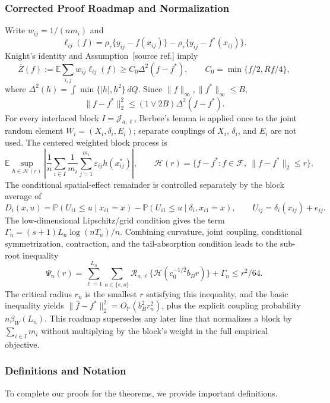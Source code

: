 \documentclass[twoside,11pt]{article}
\makeatletter
\newenvironment{revision}{\color{revisionred}}{}
\newcommand{\discardlabel}[1]{}
\newcommand{\discardtwo}[2]{}
\newcommand{\legacyref}[1]{\textup{[source ref.]}}
\newcommand{\legacyeqref}[1]{\textup{[source equation]}}
\newenvironment{legacycomparison}{%
  \begingroup\color{legacygray}%
  \let\label\discardlabel
  \let\originallabel\discardlabel
  \let\ref\legacyref
  \let\pageref\legacyref
  \let\eqref\legacyeqref
  \let\cref\legacyref
  \let\Cref\legacyref
  \let\autoref\legacyref
  \let\aliasref\discardtwo
}{\endgroup}
\newcommand{\aliasref}[2]{%
  \@ifundefined{r@#2}{}{%
    \expandafter\let\csname r@#1\expandafter\endcsname\csname r@#2\endcsname}}
\makeatother
\begin{document}
\begin{legacycomparison}
\subsubsection{Corrected Proof Roadmap and Normalization}
\begin{revision}
Write $w_{ij}=1/(nm_i)$ and
\[
 \ell_{ij}(f)=\rho_\tau\{y_{ij}-f(x_{ij})\}
 -\rho_\tau\{y_{ij}-f^*(x_{ij})\}.
\]
Knight's identity and Assumption~\ref{assumptionA} imply
\[
 \overline Z(f):=\mathbb E\sum_{i,j}w_{ij}\ell_{ij}(f)
 \ge C_0\Delta^2(f-f^*),\qquad
 C_0=\min\{\underline f/2,R\underline f/4\},
\]
where $\Delta^2(h)=\int\min\{|h|,h^2\}\,dQ$. Since
$\|f\|_\infty,\|f^*\|_\infty\le B$,
\[
 \|f-f^*\|_2^2\le (1\vee 2B)\Delta^2(f-f^*).
\]
For every interlaced block $I=\mathcal J_{a,\ell}$, Berbee's lemma is applied once to the joint random element $W_i=(X_i,\delta_i,E_i)$; separate couplings of $X_i$, $\delta_i$, and $E_i$ are not used. The centered weighted block process is
\[
 \mathbb E\sup_{h\in\mathcal H(r)}
 \left|\frac1n\sum_{i\in I}\frac1{m_i}
 \sum_{j=1}^{m_i}\varepsilon_{ij}h(x_{ij}^*)\right|,
 \qquad
 \mathcal H(r)=\{f-f^*:f\in\mathcal F,\ \|f-f^*\|_2\le r\}.
\]
The conditional spatial-effect remainder is controlled separately by the
block average of
\[
 D_i(x,u)=\mathbb P(U_{i1}\le u\mid x_{i1}=x)
 -\mathbb P(U_{i1}\le u\mid\delta_i,x_{i1}=x),
 \qquad U_{ij}=\delta_i(x_{ij})+e_{ij}.
\]
The low-dimensional Lipschitz/grid condition gives the term
$\Gamma_n=(s+1)L_n\log(nT_n)/n$.  Combining curvature, joint coupling,
conditional symmetrization, contraction, and the tail-absorption condition
leads to the sub-root inequality
\[
 \Psi_n(r)=\sum_{\ell=1}^{L_n}\sum_{a\in\{e,o\}}
 \mathcal R_{a,\ell}\{\mathcal H(c_0^{-1/2}b_Br)\}+\Gamma_n
 \le r^2/64.
\]
The critical radius $r_n$ is the smallest $r$ satisfying this inequality,
and the basic inequality yields
$\|\widehat f-f^*\|_2^2=O_{\mathbb P}(b_B^2r_n^2)$, plus the explicit
coupling probability $n\beta_W(L_n)$. This roadmap supersedes any later line
that normalizes a block by $\sum_{i\in I}m_i$ without multiplying by the
block's weight in the full empirical objective.
\end{revision}

\subsubsection{Definitions and Notation}
To complete our proofs for the theorems, we provide important definitions.


\end{legacycomparison}
\end{document}
